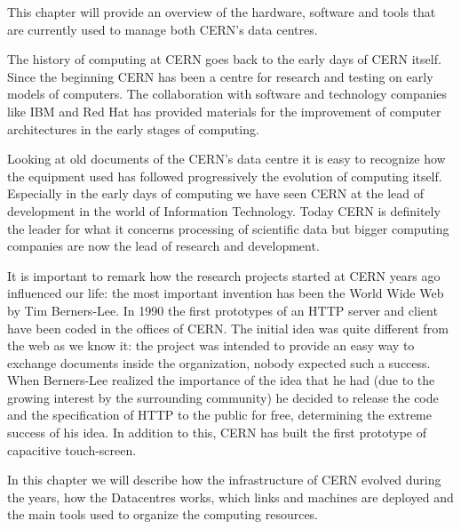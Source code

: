 This chapter will provide an overview of the hardware, software and tools
that are currently used to manage both CERN's data centres.

The history of computing at CERN goes back to the early days of CERN
itself. Since the beginning CERN has been a centre for research and
testing on early models of computers. The collaboration with software and
technology companies like IBM \cite{IBMWebsite} and Red Hat
\cite{RedHatWebsite} has provided materials for the improvement of
computer architectures in the early stages of computing.

Looking at old documents of the CERN's data centre it is easy to recognize
how the equipment used has followed progressively the evolution of
computing itself. Especially in the early days of computing we have seen
CERN at the lead of development in the world of Information Technology.
Today CERN is definitely the leader for what it concerns processing of
scientific data but bigger computing companies are now the lead of
research and development.

It is important to remark how the research projects started at CERN years
ago influenced our life: the most important invention has been the World
Wide Web by Tim Berners-Lee. In 1990 the first prototypes of an HTTP
server and client have been coded in the offices of CERN. The initial idea
was quite different from the web as we know it: the project was intended
to provide an easy way to exchange documents inside the organization,
nobody expected such a success. When Berners-Lee realized the importance
of the idea that he had (due to the growing interest by the surrounding
community) he decided to release the code and the specification of HTTP to
the public for free, determining the extreme success of his idea. In
addition to this, CERN has built the first prototype of capacitive
touch-screen.

In this chapter we will describe how the infrastructure of CERN evolved
during the years, how the Datacentres works, which links and machines
are deployed and the main tools used to organize the computing resources.
